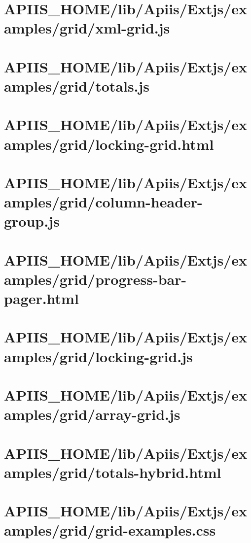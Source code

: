 \section{APIIS\_HOME/lib/Apiis/Extjs/examples/grid/xml-grid.js} 
\section{APIIS\_HOME/lib/Apiis/Extjs/examples/grid/totals.js} 
\section{APIIS\_HOME/lib/Apiis/Extjs/examples/grid/locking-grid.html} 
\section{APIIS\_HOME/lib/Apiis/Extjs/examples/grid/column-header-group.js} 
\section{APIIS\_HOME/lib/Apiis/Extjs/examples/grid/progress-bar-pager.html} 
\section{APIIS\_HOME/lib/Apiis/Extjs/examples/grid/locking-grid.js} 
\section{APIIS\_HOME/lib/Apiis/Extjs/examples/grid/array-grid.js} 
\section{APIIS\_HOME/lib/Apiis/Extjs/examples/grid/totals-hybrid.html} 
\section{APIIS\_HOME/lib/Apiis/Extjs/examples/grid/grid-examples.css} 
